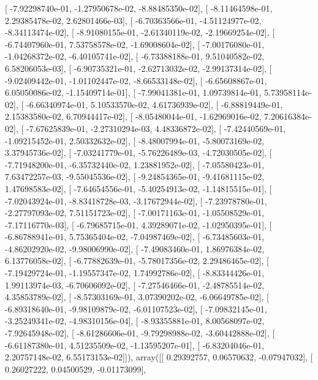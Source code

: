 \documentclass{article}
\begin{document}
       [ -7.92298740e-01,  -1.27950678e-02,  -8.88485350e-02],
       [ -8.11464598e-01,   2.29385478e-02,   2.62801466e-03],
       [ -6.70363566e-01,  -4.51124977e-02,  -8.34113474e-02],
       [ -8.91080155e-01,  -2.61340119e-02,  -2.19669254e-02],
       [ -6.74407960e-01,   7.53758578e-02,  -1.69008604e-02],
       [ -7.00176080e-01,  -1.04268372e-02,  -6.40105741e-02],
       [ -6.73388188e-01,   9.51040582e-02,   6.58206053e-03],
       [ -6.90735321e-01,  -2.62713032e-02,  -2.99137314e-02],
       [ -9.02409442e-01,  -1.01102447e-02,  -8.66533148e-02],
       [ -6.65608867e-01,   6.05050086e-02,  -1.15409714e-01],
       [ -7.99041381e-01,   1.09739814e-01,   5.73958114e-02],
       [ -6.66340974e-01,   5.10533570e-02,   4.61736939e-02],
       [ -6.88819449e-01,   2.15383580e-02,   6.70944417e-02],
       [ -8.05480044e-01,  -1.62969016e-02,   7.20616384e-02],
       [ -7.67625839e-01,  -2.27310294e-03,   4.48336872e-02],
       [ -7.42440569e-01,  -1.09215452e-01,   2.50332632e-02],
       [ -8.48007994e-01,  -5.80073169e-02,   3.37945736e-02],
       [ -7.03241779e-01,  -5.76226489e-03,  -4.72030505e-02],
       [ -7.71948200e-01,  -6.35732440e-02,   1.23881952e-02],
       [ -7.05580423e-01,   7.63472257e-03,  -9.55045536e-02],
       [ -9.24854365e-01,  -9.41681115e-02,   1.47698583e-02],
       [ -7.64654556e-01,  -5.40254913e-02,  -1.14815515e-01],
       [ -7.02043924e-01,  -8.83418728e-03,  -3.17672944e-02],
       [ -7.23978780e-01,  -2.27797093e-02,   7.51151723e-02],
       [ -7.00171163e-01,  -1.05508529e-01,  -7.17116770e-03],
       [ -6.79685715e-01,   4.39289071e-02,  -1.02950395e-01],
       [ -6.86788941e-01,   5.75365404e-02,  -7.04987469e-02],
       [ -6.73485603e-01,  -4.86202920e-02,  -9.98006990e-02],
       [ -7.49083460e-01,   1.86976384e-02,   6.13776058e-02],
       [ -6.77882639e-01,  -5.78017356e-02,   2.29486465e-02],
       [ -7.19429724e-01,  -1.19557347e-02,   1.74992786e-02],
       [ -8.83344426e-01,   1.99113974e-03,  -6.70606092e-02],
       [ -7.27546466e-01,  -2.48785514e-02,   4.35853789e-02],
       [ -8.57303169e-01,   3.07390202e-02,  -6.06649785e-02],
       [ -6.89318640e-01,  -9.98109879e-02,  -6.01107523e-02],
       [ -7.09832145e-01,  -3.25249341e-02,  -4.98310156e-04],
       [ -8.93355881e-01,   8.00568097e-02,  -7.92645948e-02],
       [ -8.61286606e-01,  -9.79298988e-02,  -3.60442888e-02],
       [ -6.61187380e-01,   4.51235509e-02,  -1.13595207e-01],
       [ -6.83204046e-01,   2.20757148e-02,   6.55173153e-02]]), array([[ 0.29392757,  0.06570632, -0.07947032],
       [ 0.26027222,  0.04500529, -0.01173099],
\end{document}
